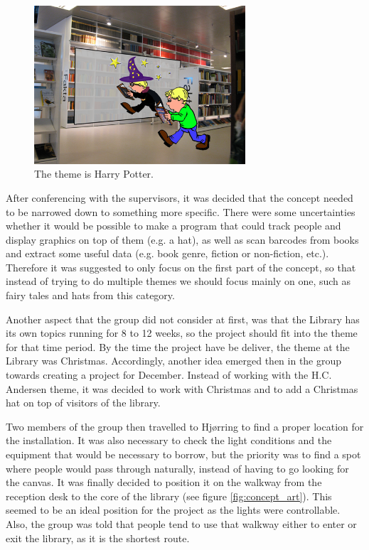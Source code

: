 \begin{figure}[htbp]
\centering
\includegraphics[width=0.7\textwidth]{Pictures/HjoerringLibrary/magician.png}
\caption{The theme is Harry Potter.}
\label{fig:bookTheme}
\end{figure}

After conferencing with the supervisors, it was decided that the concept needed to be narrowed down to something more specific. There were some uncertainties whether it would be possible to make a program that could track people and display graphics on top of them (e.g. a hat), as well as scan barcodes from books and extract some useful data (e.g. book genre, fiction or non-fiction, etc.). Therefore it was suggested to only focus on the first part of the concept, so that instead of trying to do multiple themes we should focus mainly on one, such as fairy tales and hats from this category.

Another aspect that the group did not consider at first, was that the Library has its own topics running for 8 to 12 weeks, so the project should fit into the theme for that time period. By the time the project have be deliver, the theme at the Library was Christmas. Accordingly, another idea emerged then in the group towards creating a project for December. Instead of working with the H.C. Andersen theme, it was decided to work with Christmas and to add a Christmas hat on top of visitors of the library.

Two members of the group then travelled to Hj{\o}rring to find a proper location for the installation. It was also necessary to check the light conditions and the equipment that would be necessary to borrow, but the priority was to find a spot where people would pass through naturally, instead of having to go looking for the canvas. It was finally decided to position it on the walkway from the reception desk to the core of the library (see figure \ref{fig:concept_art}). This seemed to be an ideal position for the project as the lights were controllable. Also, the group was told that people tend to use that walkway either to enter or exit the library, as it is the shortest route. 

